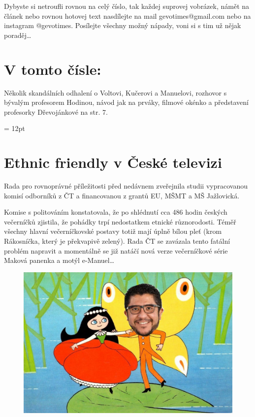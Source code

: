 \documentclass[twoside, 11pt]{article}
\begin{document}
 Dybyste si netroufli rovnou na celý číslo, tak každej suprovej vobrázek,
 námět na článek nebo rovnou hotovej text nasdílejte na mail \mbox{gevotimes@gmail.com} nebo na instagram \mbox{@gevotimes}.
 Posílejte všechny možný nápady, voni si s tim už nějak poraděj\dots

\section*{V tomto čísle:}
Několik skandálních odhalení o Voltovi, Kučerovi a Manuelovi, rozhovor s bývalým profesorem Hodinou, návod jak na prváky, filmové okénko a představení profesorky Dřevojánkové na str. 7.

\clearpage
\headheight = 12pt

\section*{Ethnic friendly v České televizi}
Rada pro rovnoprávné příležitosti před nedávnem
zveřejnila studii vypracovanou komisí odborníků z
ČT a financovanou z grantů EU, MŠMT a MŠ
Jažlovická.


Komise s politováním konstatovala, že po shlédnutí
cca 486 hodin českých večerníčků zjistila, že
pohádky trpí nedostatkem etnické různorodosti.
Téměř všechny hla\-vní večerníčkovské postavy totiž
mají úplně bílou pleť (krom Rákosníčka, který je
překvapivě zelený). Rada ČT se zavázala tento
fatální problém napravit a momentálně se již natáčí
nová verze večerníčkové série Maková panenka a
motýl e-Manuel\dots


\begin{figure}[htbp]
    \centering
    \includegraphics[width=\textwidth]{emanuel}
\end{figure}
\end{document}

